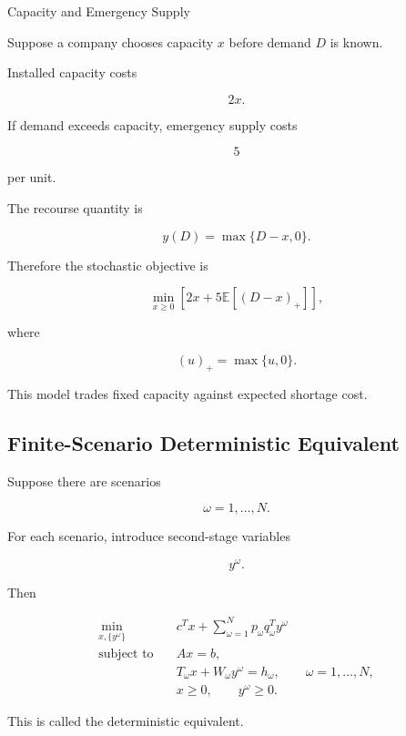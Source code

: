 \begin{workedexamplebox}{Capacity and Emergency Supply}

Suppose a company chooses capacity \(x\) before demand \(D\) is known.

Installed capacity costs

\[
2x.
\]

If demand exceeds capacity, emergency supply costs

\[
5
\]

per unit.

The recourse quantity is

\[
y(D)
=
\max
\{
D-x,0
\}.
\]

Therefore the stochastic objective is

\[
\boxed{
\min_{x\geq0}
\left[
2x
+
5
\mathbb{E}
\left[
(D-x)_+
\right]
\right],
}
\]

where

\[
(u)_+
=
\max\{u,0\}.
\]

This model trades fixed capacity against expected shortage cost.

\end{workedexamplebox}

\subsection{Finite-Scenario Deterministic Equivalent}
\label{subsec:finite-scenario-deterministic-equivalent}

Suppose there are scenarios

\[
\omega=1,\ldots,N.
\]

For each scenario, introduce second-stage variables

\[
y^\omega.
\]

Then

\[
\boxed{
\begin{aligned}
\min_{x,\{y^\omega\}}
\quad&
c^Tx
+
\sum_{\omega=1}^{N}
p_\omega
q_\omega^T
y^\omega
\\
\text{subject to}
\quad&
Ax=b,
\\
&
T_\omega x
+
W_\omega y^\omega
=
h_\omega,
\qquad
\omega=1,\ldots,N,
\\
&
x\geq0,
\qquad
y^\omega\geq0.
\end{aligned}
}
\]

This is called the deterministic equivalent.

